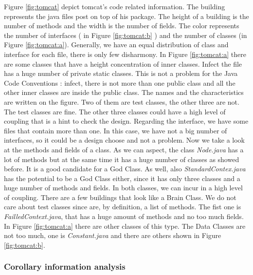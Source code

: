 \documentclass[]{usiinfbachelorproject}
\begin{document}
Figure \ref{fig:tomcat} depict tomcat's code related information. The building represents the java files post on top of his package. The height of a building is the number of methods and the width is the number of fields. The color represents the number of interfaces ( in Figure \ref{fig:tomcat:b} ) and  the number of classes (in Figure  \ref{fig:tomcat:a}).
Generally, we have an equal distribution of class and interface for each file, there is only few disharmony.
In Figure \ref{fig:tomcat:a} there are some classes that have a height concentration of inner classes. Infect the file has a huge number of private static classes. This is not a problem for the Java Code Conventions \cite{oracle}: infect, there is not more than one public class and all the other inner classes are inside the public class. The names and the characteristics are written on the figure. Two of them are test classes, the other three are not. The test classes are fine. The other three classes could have a high level of coupling that is a hint to check the design. Regarding the interface, we have some files that contain more than one. In this case, we have not a big number of interfaces, so it could be a design choose and not a problem.
Now we take a look at the methods and fields of a class. As we can aspect, the class \textit{Node.java} has a lot of methods but at the same time it has a huge number of classes as showed before. It is a good candidate for a God Class. As well, also \textit{StandardContex.java} has the potential to be a God Class either, since it has only three classes and a huge number of methods and fields. In both classes, we can incur in a high level of coupling.
There are a few buildings that look like a Brain Class. We do not care about test classes since are, by definition, a list of methods. The fist one is  \textit{FailledContext.java}, that has a huge amount of methods and no too much fields. In Figure \ref{fig:tomcat:a} there are other classes of this type.
The Data Classes are not too much, one is \textit{Constant.java} and there are others shown in Figure \ref{fig:tomcat:b}.



\subsubsection{Corollary information analysis}
\end{document}
